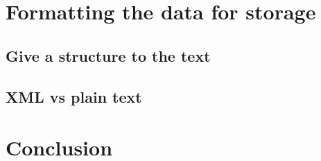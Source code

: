 \documentclass[a4paper,10pt]{article}
\begin{document}
\section{Formatting the data for storage}
\label{sec:format}

\subsection{Give a structure to the text}
\label{sec:textstructure}

\subsection{XML vs plain text}
\label{sec:xml}

\section{Conclusion}
\label{sec:conclusion}
\end{document}
